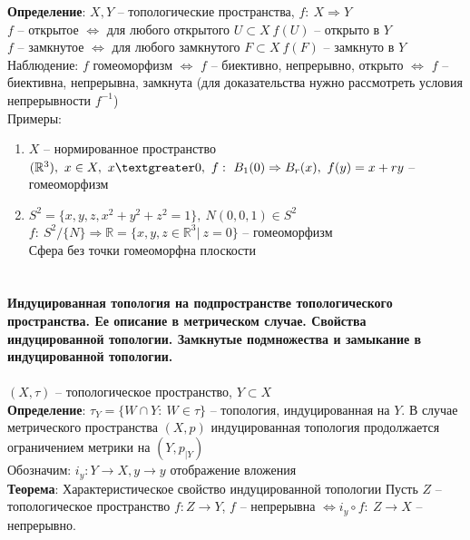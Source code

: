 	\textbf{Определение}: $X, Y$ -- топологические пространства, $f:\ X \Rightarrow Y$ \\
	$f$ -- открытое $\Leftrightarrow$ для любого открытого $U \subset X\ f(U)$ -- открыто в $Y$\\
	$f$ -- замкнутое $\Leftrightarrow$ для любого замкнутого $F \subset X\ f(F)$ -- замкнуто в $Y$\\
	Наблюдение: $f$ гомеоморфизм $\Leftrightarrow$ $f$ -- биективно, непрерывно, открыто $\Leftrightarrow$ $f$ -- биективна, непрерывна, замкнута (для доказательства нужно рассмотреть условия непрерывности $f^{-1}$)\\
	Примеры:
	\begin{enumerate}
		\item 
		$X$ -- нормированное пространство $(\mathbb{R}^3),\ x\in X,\ x\textgreater 0,\ f:\ B_1(0)\Rightarrow B_r (x),\ f(y)=x + ry$ -- гомеоморфизм
		\item 
		$S^2 = \{x,y,z, x^2 + y^2 + z^2=1\},\ N(0,0,1) \in S^2$\\
		$f:\ S^2 \slash \{N\} \Rightarrow \mathbb{R} = \{x,y,z \in \mathbb{R}^3 |\ z= 0\}$ -- гомеоморфизм\\
		Сфера без точки гомеоморфна плоскости
	\end{enumerate}
	\begin{figure}[h]
	\end{figure}


\newpage
\section{}
	\textbf{Индуцированная топология на подпространстве топологического пространства. Ее описание в метрическом случае. Свойства индуцированной топологии. Замкнутые подмножества и замыкание в индуцированной топологии.}\\
	\\
	$(X, \tau)$ -- топологическое пространство, $Y\subset X$\\
	\textbf{Определение}: $\tau_Y = \{W \cap Y:\ W\in \tau\}$ -- топология, индуцированная на $Y$. В случае метрического пространства $(X,p)$ индуцированная топология продолжается ограничением метрики на $(Y, p_{\mid Y})$\\
	Обозначим: $i_y: Y\rightarrow X, y\rightarrow y$ отображение вложения\\
	\textbf{Теорема}: Характеристическое свойство индуцированной топологии Пусть $Z$ -- топологическое пространство $f: Z\rightarrow Y$, $f$ -- непрерывна $\Leftrightarrow i_y \circ f:\ Z\rightarrow X$ -- непрерывно.
	\begin{figure}[h]
	\end{figure}\\
	
